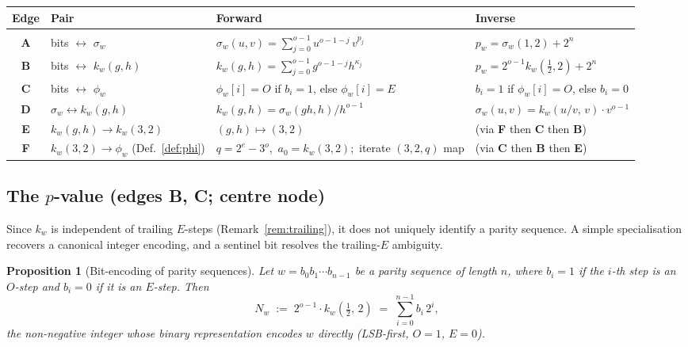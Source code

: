 \documentclass[12pt]{article}
\newtheorem{proposition}[theorem]{Proposition}
\theoremstyle{definition}
\theoremstyle{remark}
\newcommand{\kpoly}{k}
\begin{document}
\bigskip
\noindent
\begin{tabular}{@{}clp{4.8cm}p{4.4cm}@{}}
\hline
\textbf{Edge} & \textbf{Pair} & \textbf{Forward} & \textbf{Inverse} \\
\hline
\\[-6pt]
\textbf{A} & bits $\leftrightarrow$ $\sigma_w$
  & $\sigma_w(u,v) = \displaystyle\sum_{j=0}^{o-1} u^{o-1-j}\,v^{p_j}$
  & $p_w = \sigma_w(1,2) + 2^n$ \\[10pt]
\textbf{B} & bits $\leftrightarrow$ $\kpoly_w(g,h)$
  & $\kpoly_w(g,h) = \displaystyle\sum_{j=0}^{o-1} g^{o-1-j} h^{\kappa_j}$
  & $p_w = 2^{o-1}\kpoly_w(\tfrac{1}{2},2) + 2^n$ \\[10pt]
\textbf{C} & bits $\leftrightarrow$ $\phi_w$
  & $\phi_w[i] = O$ if $b_i = 1$, else $\phi_w[i] = E$
  & $b_i = 1$ if $\phi_w[i] = O$, else $b_i = 0$ \\[8pt]
\textbf{D} & $\sigma_w \leftrightarrow \kpoly_w(g,h)$
  & $\kpoly_w(g,h) = \sigma_w(gh,h)/h^{o-1}$
  & $\sigma_w(u,v) = \kpoly_w(u/v,\,v)\cdot v^{o-1}$ \\[8pt]
\textbf{E} & $\kpoly_w(g,h) \to \kpoly_w(3,2)$
  & $(g,h)\mapsto(3,2)$
  & (via \textbf{F} then \textbf{C} then \textbf{B}) \\[8pt]
\textbf{F} & $\kpoly_w(3,2) \to \phi_w$ (Def.~\ref{def:phi})
  & $q = 2^e{-}3^o$,\ $a_0 = \kpoly_w(3,2)$;\ iterate $(3,2,q)$ map
  & (via \textbf{C} then \textbf{B} then \textbf{E}) \\[6pt]
\hline
\end{tabular}

\subsection{The $p$-value (edges B, C; centre node)}

Since $\kpoly_w$ is independent of trailing $E$-steps (Remark~\ref{rem:trailing}),
it does not uniquely identify a parity sequence.  A simple specialisation
recovers a canonical integer encoding, and a sentinel bit resolves the
trailing-$E$ ambiguity.

\begin{proposition}[Bit-encoding of parity sequences]
\label{prop:bits}
Let $w = b_0 b_1 \cdots b_{n-1}$ be a parity sequence of length $n$, where
$b_i = 1$ if the $i$-th step is an $O$-step and $b_i = 0$ if it is an
$E$-step.  Then
\[
  N_w \;:=\; 2^{o-1}\cdot\kpoly_w\!\left(\tfrac{1}{2},\, 2\right)
  \;=\; \sum_{i=0}^{n-1} b_i\, 2^i,
\]
the non-negative integer whose binary representation encodes $w$ directly
(LSB-first, $O = 1$, $E = 0$).
\end{proposition}
\end{document}
